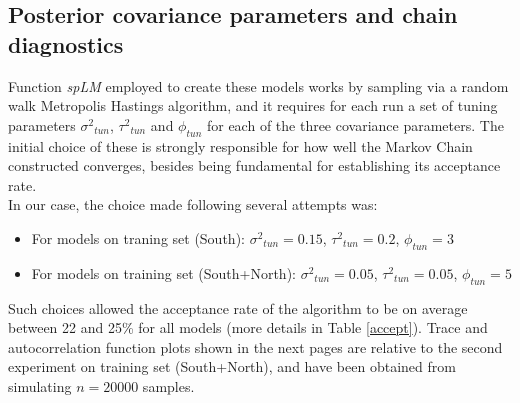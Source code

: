 \documentclass[12pt]{article}
\begin{document}
\subsection{Posterior covariance parameters and chain diagnostics}
	Function \emph{spLM} employed to create these models works by sampling via a random walk Metropolis Hastings algorithm, and it requires for each run a set of tuning parameters ${\sigma^2}_{tun}$, ${\tau^2}_{tun}$ and ${\phi}_{tun}$ for each of the three covariance parameters. The initial choice of these is strongly responsible for how well the Markov Chain constructed converges, besides being fundamental for establishing its acceptance rate. \\
	
	\noindent
	In our case, the choice made following several attempts was: \\
	\begin{itemize}
		\item For models on traning set (South): ${\sigma^2}_{tun} = 0.15$, ${\tau^2}_{tun} = 0.2$, ${\phi}_{tun} = 3$
		\item For models on training set (South+North): ${\sigma^2}_{tun} = 0.05$, ${\tau^2}_{tun} = 0.05$, ${\phi}_{tun} = 5$
	\end{itemize}
	\vspace{3 mm}
	Such choices allowed the acceptance rate of the algorithm to be on average between 22 and 25\% for all models (more details in Table \ref{accept}). Trace and autocorrelation function plots shown in the next pages are relative to the second experiment on training set (South+North), and have been obtained from simulating $n=20000$ samples.\footnotemark
	
\end{document}
